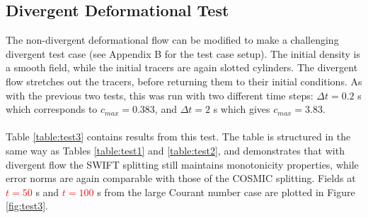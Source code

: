 \documentclass{ametsocV6.1}
\newcommand{\change}[1]{\textcolor{red}{#1}}
\begin{document}
\subsection{Divergent Deformational Test} \label{sec:test3}

The non-divergent deformational flow can be modified to make a challenging divergent test case (see Appendix B for the test case setup). The initial density is a smooth field, while the initial tracers are again slotted cylinders. The divergent flow stretches out the tracers, before returning them to their initial conditions.
As with the previous two tests, this was run with two different time steps: $\Delta t=0.2$ s which corresponds to $c_{max}=0.383$, and $\Delta t=2$ s which gives $c_{max}=3.83$. \\
\\
Table \ref{table:test3} contains results from this test.
The table is structured in the same way as Tables \ref{table:test1} and \ref{table:test2}, and demonstrates that with divergent flow the SWIFT splitting still maintains monotonicity properties, while error norms are again comparable with those of the COSMIC splitting.
Fields at \change{$t=50$} s and \change{$t=100$} s from the large Courant number case are plotted in Figure \ref{fig:test3}. \\
\end{document}
